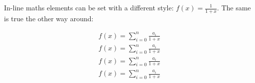 \documentclass[12pt, a4paper, twopage]{scrartcl}
\begin{document}
In-line maths elements can be set with a different style: \(f(x) = \displaystyle \frac{1}{1+x}\). The same is true the other way around:

\begin{eqnarray*}
	f(x) = \sum_{i=0}^{n} \frac{a_i}{1+x} \\
	\textstyle f(x) = \textstyle \sum_{i=0}^{n} \frac{a_i}{1+x} \\
	\scriptstyle f(x) = \scriptstyle \sum_{i=0}^{n} \frac{a_i}{1+x} \\
	\scriptscriptstyle f(x) = \scriptscriptstyle \sum_{i=0}^{n} \frac{a_i}{1+x}
\end{eqnarray*}
\end{document}
